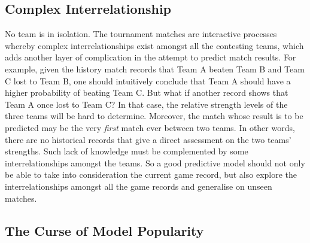 \subsection{Complex Interrelationship}

No team is in isolation. The tournament matches are interactive processes whereby complex interrelationships exist amongst all the contesting teams, which adds another layer of complication in the attempt to predict match results. For example, given the history match records that Team A beaten Team B and Team C lost to Team B, one should intuitively conclude that Team A should have a higher probability of beating Team C. But what if another record shows that Team A once lost to Team C? In that case, the relative strength levels of the three teams will be hard to determine. Moreover, the match whose result is to be predicted may be the very \emph{first} match ever between two teams. In other words, there are no historical records that give a direct assessment on the two teams' strengths. Such lack of knowledge must be complemented by some interrelationships amongst the teams. So a good predictive model should not only be able to take into consideration the current game record, but also explore the interrelationships amongst all the game records and generalise on unseen matches. 

\subsection{The Curse of Model Popularity}

